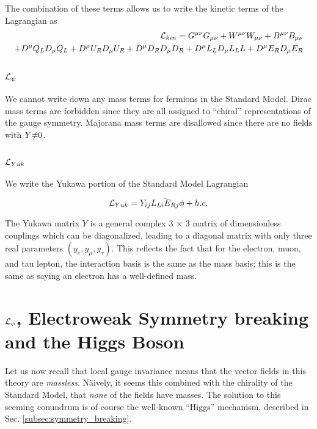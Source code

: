 The combination of these terms allows us to write the kinetic terms of the Lagrangian as
\begin{equation}
\begin{aligned}
\mathcal{L}_{kin} = G^{\mu\nu} G_{\mu\nu} + W^{\mu\nu} W_{\mu\nu} + B^{\mu\nu} B_{\mu\nu}\\
 + D^\mu Q_L D_\mu Q_L + D^\mu U_R D_\mu U_R +  D^\mu D_R D_\mu D_R + D^\mu L_L D_\mu L_LL + D^\mu E_R D_\mu E_R
\end{aligned}
\end{equation}

\subsection{$\mathcal{L}_{\psi}$ }

We cannot write down any mass terms for fermions in the Standard Model.
Dirac mass terms are forbidden since they are all assigned to ``chiral'' representations of the gauge symmetry.
Majorana mass terms are disallowed since there are no fields with $Y \slashed{=} 0$.

\subsection{$\mathcal{L}_{Yuk}$ }

We write the Yukawa portion of the Standard Model Lagrangian

\begin{equation}
\mathcal{L}_{Yuk} = Y_{ij}\bar{L_{Li} E_{Rj}} \phi + h.c.
\end{equation}

The Yukawa matrix $Y$ is a general complex 3 $\times$ 3 matrix of dimensionless couplings which can be diagonalized, leading to a diagonal matrix with only three real parameters $(y_e , y_\mu , y_\tau)$.
This reflects the fact that for the electron, muon, and tau lepton, the interaction basis is the same as the mass basis; this is the same as saying an electron has a well-defined mass.

\section{$\mathcal{L}_\phi$, Electroweak Symmetry breaking and the Higgs Boson}

Let us now recall that local gauge invariance means that the vector fields in this theory are \textit{massless}.
N\"aively, it seems this combined with the chirality of the Standard Model, that \textit{none} of the fields have masses.
The solution to this seeming conundrum is of course the well-known ``Higgs'' mechanism, described in Sec. \ref{subsec:symmetry_breaking}.

